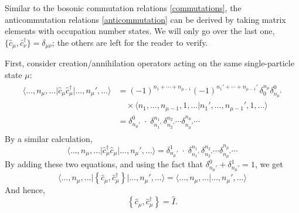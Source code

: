 \documentclass[prx,12pt]{revtex4-2}
\begin{document}
Similar to the bosonic commutation relations \eqref{commutations}, the
anticommutation relations \eqref{anticommutation} can be derived by
taking matrix elements with occupation number states.  We will only go
over the last one, $\big\{\hat{c}_\mu,\hat{c}_\nu^\dagger\big\} =
\delta_{\mu\nu}$; the others are left for the reader to verify.

First, consider creation/annihilation operators acting on the same
single-particle state $\mu$:
\begin{align}
  \begin{aligned}\big\langle \dots,n_\mu,\dots \big| \hat{c}_\mu \hat{c}_\mu^\dagger \big|\dots, n_\mu', \dots\big\rangle &= (-1)^{n_1+\cdots+n_{\mu-1}} (-1)^{n_1'+\cdots+n_{\mu-1}'} \,\delta^{n_\mu}_0 \delta^0_{n_\mu'} \\ &\quad\times \big\langle n_1,\dots,n_{\mu-1}, 1, \dots\big| n_1',\dots,n_{\mu-1}', 1, \dots \big\rangle \\ &= \delta^0_{n_\mu'} \; \cdot \; \delta^{n_1}_{n_1'} \, \delta^{n_2}_{n_2'} \cdots \delta^{n_\mu}_{n_\mu'} \cdots\end{aligned}
\end{align}
By a similar calculation,
\begin{equation}
  \big\langle \dots,n_\mu,\dots \big| \hat{c}_\mu^\dagger \hat{c}_\mu \big|\dots, n_\mu', \dots\big\rangle = \delta^1_{n_\mu'} \; \cdot \; \delta^{n_1}_{n_1'} \, \delta^{n_2}_{n_2'} \cdots \delta^{n_\mu}_{n_\mu'} \cdots
\end{equation}
By adding these two equations, and using the fact that
$\delta^0_{n_\mu'} + \delta^1_{n_\mu'} = 1$, we get
\begin{equation}
  \big\langle \dots,n_\mu,\dots \big| \left\{ \hat{c}_\mu, \hat{c}_\mu^\dagger\right\} \big|\dots, n_\mu', \dots\big\rangle = \big\langle \dots,n_\mu,\dots \big|\dots, n_\mu', \dots\big\rangle
\end{equation}
And hence,
\begin{equation}
  \left\{ \hat{c}_\mu, \hat{c}_\mu^\dagger\right\} = \hat{I}.
\end{equation}
\end{document}
